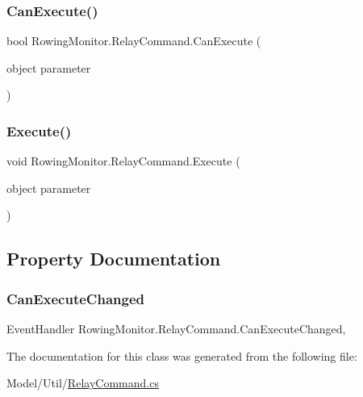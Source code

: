 \subsubsection{\texorpdfstring{Can\+Execute()}{CanExecute()}}
{\footnotesize\ttfamily bool Rowing\+Monitor.\+Relay\+Command.\+Can\+Execute (\begin{DoxyParamCaption}\item[{object}]{parameter }\end{DoxyParamCaption})}

\mbox{\label{class_rowing_monitor_1_1_relay_command_ac4ca734c8e04bfb87cf1a1c295fb2d5b}} 
\subsubsection{\texorpdfstring{Execute()}{Execute()}}
{\footnotesize\ttfamily void Rowing\+Monitor.\+Relay\+Command.\+Execute (\begin{DoxyParamCaption}\item[{object}]{parameter }\end{DoxyParamCaption})}



\subsection{Property Documentation}
\mbox{\label{class_rowing_monitor_1_1_relay_command_ae4dd035ea91a110089885a49c15fa525}} 
\subsubsection{\texorpdfstring{Can\+Execute\+Changed}{CanExecuteChanged}}
{\footnotesize\ttfamily Event\+Handler Rowing\+Monitor.\+Relay\+Command.\+Can\+Execute\+Changed\hspace{0.3cm}{\ttfamily [add]}, {\ttfamily [remove]}}



The documentation for this class was generated from the following file\+:\begin{DoxyCompactItemize}
\item 
Model/\+Util/\hyperlink{_relay_command_8cs}{Relay\+Command.\+cs}\end{DoxyCompactItemize}
